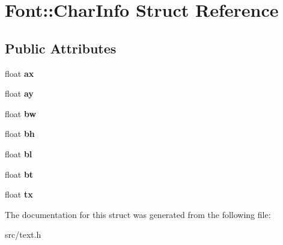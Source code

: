 \hypertarget{struct_font_1_1_char_info}{}\section{Font\+:\+:Char\+Info Struct Reference}
\label{struct_font_1_1_char_info}
\subsection*{Public Attributes}
\begin{DoxyCompactItemize}
\item 
\hypertarget{struct_font_1_1_char_info_a2470f2ec8620001d4d32fe993a6904d5}{}float {\bfseries ax}\label{struct_font_1_1_char_info_a2470f2ec8620001d4d32fe993a6904d5}

\item 
\hypertarget{struct_font_1_1_char_info_abfbc6fc9aaec8abb8aff9c107c59dcca}{}float {\bfseries ay}\label{struct_font_1_1_char_info_abfbc6fc9aaec8abb8aff9c107c59dcca}

\item 
\hypertarget{struct_font_1_1_char_info_a0881be09b1f0079b63d051e668554411}{}float {\bfseries bw}\label{struct_font_1_1_char_info_a0881be09b1f0079b63d051e668554411}

\item 
\hypertarget{struct_font_1_1_char_info_ae9423ddaa245ecbd95472bff8513a581}{}float {\bfseries bh}\label{struct_font_1_1_char_info_ae9423ddaa245ecbd95472bff8513a581}

\item 
\hypertarget{struct_font_1_1_char_info_a533ae5ae1a3fcd8251eeb595825de0f0}{}float {\bfseries bl}\label{struct_font_1_1_char_info_a533ae5ae1a3fcd8251eeb595825de0f0}

\item 
\hypertarget{struct_font_1_1_char_info_a5520f6fc19d21a52bfd4575cc44f26e6}{}float {\bfseries bt}\label{struct_font_1_1_char_info_a5520f6fc19d21a52bfd4575cc44f26e6}

\item 
\hypertarget{struct_font_1_1_char_info_a86552e140407025d9b915ec5676e3cd9}{}float {\bfseries tx}\label{struct_font_1_1_char_info_a86552e140407025d9b915ec5676e3cd9}

\end{DoxyCompactItemize}


The documentation for this struct was generated from the following file\+:\begin{DoxyCompactItemize}
\item 
src/text.\+h\end{DoxyCompactItemize}

